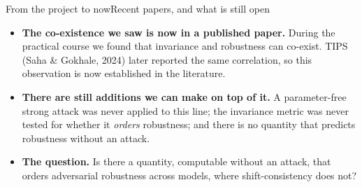 \documentclass[aspectratio=169,10pt]{beamer}
\newcommand{\tb}[1]{{\color{TUMblue}#1}}
\newcommand{\key}[1]{{\color{TUMdarker}\bfseries #1}}
\begin{document}
\begin{frame}{From the project to now}{Recent papers, and what is still open}
  \vspace{0.5em}
  \begin{itemize}\footnotesize\itemsep7pt
    \item \key{The co-existence we saw is now in a published paper.} During the practical course we found
      that invariance and robustness can co-exist. TIPS \tb{(Saha \& Gokhale, 2024)} later reported the
      same correlation, so this observation is now established in the literature.
    \item \key{There are still additions we can make on top of it.} A parameter-free strong attack was
      never applied to this line; the invariance metric was never tested for whether it \emph{orders}
      robustness; and there is no quantity that predicts robustness without an attack.
    \item \key{The question.} Is there a quantity, computable without an attack, that orders adversarial
      robustness across models, where shift-consistency does not?
  \end{itemize}
\end{frame}
\end{document}
